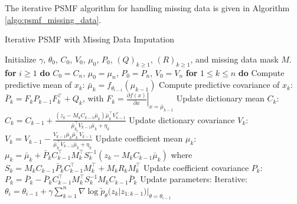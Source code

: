 \documentclass{mldsmsc}
\begin{document}
The iterative PSMF algorithm for handling missing data is given in Algorithm \ref{algo:psmf_missing_data}.

\begin{algorithm}[H]
\caption{Iterative PSMF with Missing Data Imputation}
\begin{algorithmic}[1]
\State Initialize $\gamma$, $\theta_0$, $C_0$, $V_0$, $\mu_0$, $P_0$, $(Q)_{k \geq 1}$, $(R)_{k \geq 1}$, and missing data mask $M$.
\State \textbf{for} $i \geq 1$ \textbf{do}
\State \hspace{1em} $C_0 = C_n$, $\mu_0 = \mu_n$, $P_0 = P_n$, $V_0 = V_n$
\State \hspace{1em} \textbf{for} $1 \leq k \leq n$ \textbf{do}
\State \hspace{2em} Compute predictive mean of $x_k$:
\State \hspace{3em} $\bar{\mu}_k = f_{\theta_{i-1}}(\mu_{k-1})$
\State \hspace{2em} Compute predictive covariance of $x_k$:
\State \hspace{3em} $\bar{P}_k = F_k P_{k-1} F_k^\top + Q_k$, with $F_k = \left. \frac{\partial f(x)}{\partial x} \right|_{x=\bar{\mu}_{k-1}}$
\State \hspace{2em} Update dictionary mean $C_k$:
\State \hspace{3em} $C_k = C_{k-1} + \frac{(z_k - M_k C_{k-1} \bar{\mu}_k)\bar{\mu}_k^\top V_{k-1}^\top}{\bar{\mu}_k^\top V_{k-1} \bar{\mu}_k + \eta_k}$
\State \hspace{2em} Update dictionary covariance $V_k$:
\State \hspace{3em} $V_k = V_{k-1} - \frac{V_{k-1} \bar{\mu}_k \bar{\mu}_k^\top V_{k-1}}{\bar{\mu}_k^\top V_{k-1} \bar{\mu}_k + \eta_k}$
\State \hspace{2em} Update coefficient mean $\mu_k$:
\State \hspace{3em} $\mu_k = \bar{\mu}_k + \bar{P}_k C_{k-1}^\top M_k^\top S_k^{-1} (z_k - M_k C_{k-1} \bar{\mu}_k)$
\State \hspace{3em} where $S_k = M_k C_{k-1} \bar{P}_k C_{k-1}^\top M_k^\top + M_k R_k M_k^\top$
\State \hspace{2em} Update coefficient covariance $P_k$:
\State \hspace{3em} $P_k = \bar{P}_k - \bar{P}_k C_{k-1}^\top M_k^\top S_k^{-1} M_k C_{k-1} \bar{P}_k$
\State \hspace{1em} Update parameters:
\State \hspace{2em} Iterative: $\theta_i = \theta_{i-1} + \gamma \sum_{k=1}^n \nabla \log \tilde{p}_\theta(z_k | z_{1:k-1}) |_{\theta=\theta_{i-1}}$
\end{algorithmic}\label{algo:psmf_missing_data}
\end{algorithm}
\end{document}
